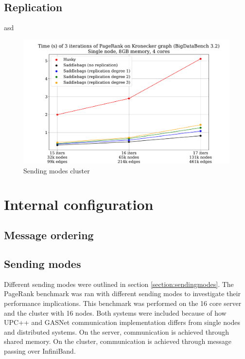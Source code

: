 \documentclass{uit-report}
\begin{document}
\subsection{Replication}
asd

\begin{figure}[H]
	\centering
	\includegraphics[width=15cm]{illustrations/huskyfaulttolerance.pdf}
	\caption{Sending modes cluster}
	\label{fig:huskyfaulttolerance}
\end{figure}

\newpage
\section{Internal configuration} \label{section:configuration}
\subsection{Message ordering}

\newpage
\subsection{Sending modes}
Different sending modes were outlined in section \ref{section:sendingmodes}. The PageRank benchmark was ran with different sending modes to investigate their performance implications. This benchmark was performed on the 16 core server and the cluster with 16 nodes. Both systems were included because of how UPC++ and GASNet communication implementation differs from single nodes and distributed systems. On the server, communication is achieved through shared memory. On the cluster, communication is achieved through message passing over InfiniBand.
\end{document}
